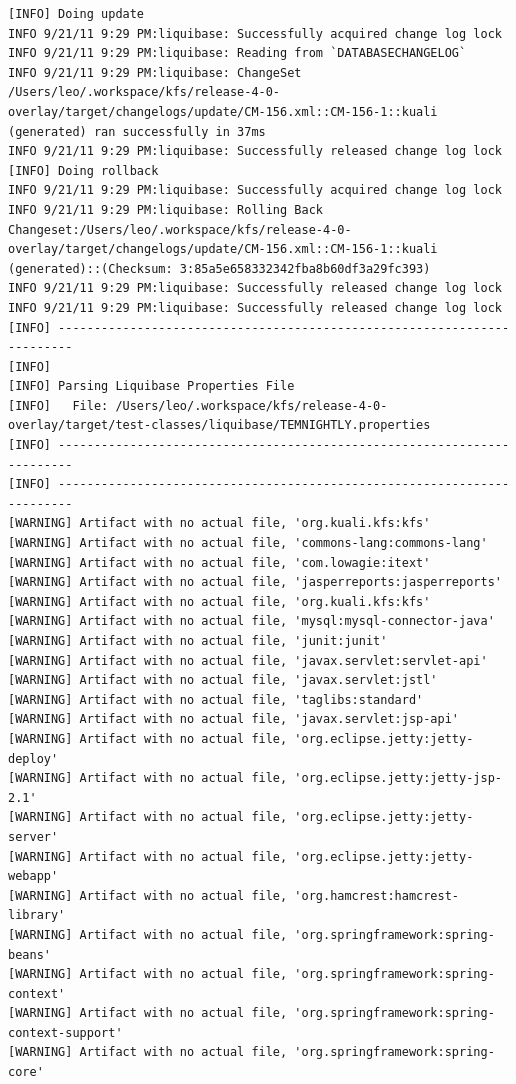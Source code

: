 \documentclass[12pt,notitlepage]{article}
\begin{document}
\begin{lstlisting}
[INFO] Doing update
INFO 9/21/11 9:29 PM:liquibase: Successfully acquired change log lock
INFO 9/21/11 9:29 PM:liquibase: Reading from `DATABASECHANGELOG`
INFO 9/21/11 9:29 PM:liquibase: ChangeSet /Users/leo/.workspace/kfs/release-4-0-overlay/target/changelogs/update/CM-156.xml::CM-156-1::kuali (generated) ran successfully in 37ms
INFO 9/21/11 9:29 PM:liquibase: Successfully released change log lock
[INFO] Doing rollback
INFO 9/21/11 9:29 PM:liquibase: Successfully acquired change log lock
INFO 9/21/11 9:29 PM:liquibase: Rolling Back Changeset:/Users/leo/.workspace/kfs/release-4-0-overlay/target/changelogs/update/CM-156.xml::CM-156-1::kuali (generated)::(Checksum: 3:85a5e658332342fba8b60df3a29fc393)
INFO 9/21/11 9:29 PM:liquibase: Successfully released change log lock
INFO 9/21/11 9:29 PM:liquibase: Successfully released change log lock
[INFO] ------------------------------------------------------------------------
[INFO]
[INFO] Parsing Liquibase Properties File
[INFO]   File: /Users/leo/.workspace/kfs/release-4-0-overlay/target/test-classes/liquibase/TEMNIGHTLY.properties
[INFO] ------------------------------------------------------------------------
[INFO] ------------------------------------------------------------------------
[WARNING] Artifact with no actual file, 'org.kuali.kfs:kfs'
[WARNING] Artifact with no actual file, 'commons-lang:commons-lang'
[WARNING] Artifact with no actual file, 'com.lowagie:itext'
[WARNING] Artifact with no actual file, 'jasperreports:jasperreports'
[WARNING] Artifact with no actual file, 'org.kuali.kfs:kfs'
[WARNING] Artifact with no actual file, 'mysql:mysql-connector-java'
[WARNING] Artifact with no actual file, 'junit:junit'
[WARNING] Artifact with no actual file, 'javax.servlet:servlet-api'
[WARNING] Artifact with no actual file, 'javax.servlet:jstl'
[WARNING] Artifact with no actual file, 'taglibs:standard'
[WARNING] Artifact with no actual file, 'javax.servlet:jsp-api'
[WARNING] Artifact with no actual file, 'org.eclipse.jetty:jetty-deploy'
[WARNING] Artifact with no actual file, 'org.eclipse.jetty:jetty-jsp-2.1'
[WARNING] Artifact with no actual file, 'org.eclipse.jetty:jetty-server'
[WARNING] Artifact with no actual file, 'org.eclipse.jetty:jetty-webapp'
[WARNING] Artifact with no actual file, 'org.hamcrest:hamcrest-library'
[WARNING] Artifact with no actual file, 'org.springframework:spring-beans'
[WARNING] Artifact with no actual file, 'org.springframework:spring-context'
[WARNING] Artifact with no actual file, 'org.springframework:spring-context-support'
[WARNING] Artifact with no actual file, 'org.springframework:spring-core'

\end{lstlisting}
\end{document}
